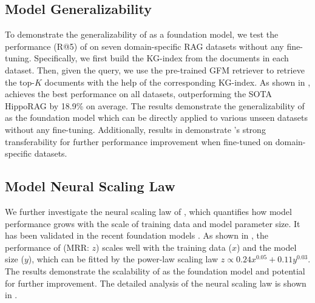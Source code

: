 
\subsection{Model Generalizability}\label{sec:generalizability}
To demonstrate the generalizability of \ourmethod as a foundation model, we test the performance (R@5) of \ourmethod on seven domain-specific RAG datasets without any fine-tuning. Specifically, we first build the KG-index from the documents in each dataset. Then, given the query, we use the pre-trained GFM retriever to retrieve the top-$K$ documents with the help of the corresponding KG-index. 
%
As shown in , \ourmethod achieves the best performance on all datasets, outperforming the SOTA HippoRAG by 18.9\% on average. The results demonstrate the generalizability of \ourmethod as the foundation model which can be directly applied to various unseen datasets without any fine-tuning. Additionally, results in  demonstrate \ourmethod's strong transferability for further performance improvement when fine-tuned on domain-specific datasets.




\subsection{Model Neural Scaling Law}\label{sec:scaling}
We further investigate the neural scaling law of \ourmethod, which quantifies how model performance grows with the scale of training data and model parameter size. It has been validated in the recent foundation models \cite{kaplan2020scaling,dehghani2023scaling}. As shown in , the performance of \ourmethod (MRR: $z$) scales well with the training data ($x$) and the model size ($y$), which can be fitted by the power-law scaling law $z \propto 0.24x^{0.05} + 0.11y^{0.03}$. The results demonstrate the scalability of \ourmethod as the foundation model and potential for further improvement. The detailed analysis of the neural scaling law is shown in .

